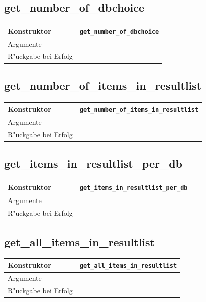 \documentclass[11pt, twoside, a4paper, BCOR8mm, DIV12, bibtotoc,idxtotoc]{scrbook}
\begin{document}
\subsection{get\_number\_of\_dbchoice}
\begin{shadowenv}
\begin{tabular}{lp{10cm}}
  Konstruktor & \texttt{get\_number\_of\_dbchoice}\\
  \hline
  Argumente     & \\
  R"uckgabe bei Erfolg & \\
\end{tabular}
\end{shadowenv}

\subsection{get\_number\_of\_items\_in\_resultlist}
\begin{shadowenv}
\begin{tabular}{lp{10cm}}
  Konstruktor & \texttt{get\_number\_of\_items\_in\_resultlist}\\
  \hline
  Argumente     & \\
  R"uckgabe bei Erfolg & \\
\end{tabular}
\end{shadowenv}

\subsection{get\_items\_in\_resultlist\_per\_db}
\begin{shadowenv}
\begin{tabular}{lp{10cm}}
  Konstruktor & \texttt{get\_items\_in\_resultlist\_per\_db}\\
  \hline
  Argumente     & \\
  R"uckgabe bei Erfolg & \\
\end{tabular}
\end{shadowenv}

\subsection{get\_all\_items\_in\_resultlist}
\begin{shadowenv}
\begin{tabular}{lp{10cm}}
  Konstruktor & \texttt{get\_all\_items\_in\_resultlist}\\
  \hline
  Argumente     & \\
  R"uckgabe bei Erfolg & \\
\end{tabular}
\end{shadowenv}
\end{document}
